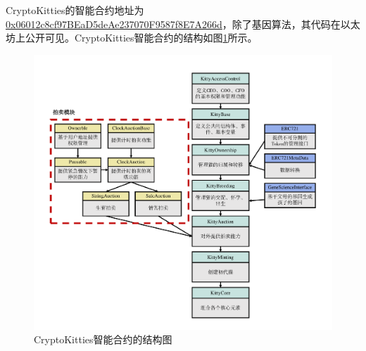 \documentclass{myreport}
\begin{document}
CryptoKitties的智能合约地址为\href{https://etherscan.io/address/0x06012c8cf97bead5deae237070f9587f8e7a266d#code}{0x06012c8cf97BEaD5deAe237070F9587f8E7A266d}，除了基因算法，其代码在以太坊上公开可见。CryptoKitties智能合约的结构如图\ref{fig:craptokitties contract}所示。
\begin{figure}[!htbp]
	\centering
	\includegraphics[width=\linewidth]{figure/cryptokitties.pdf}
	\caption{CryptoKitties智能合约的结构图}
	\label{fig:craptokitties contract}
\end{figure}
\end{document}
